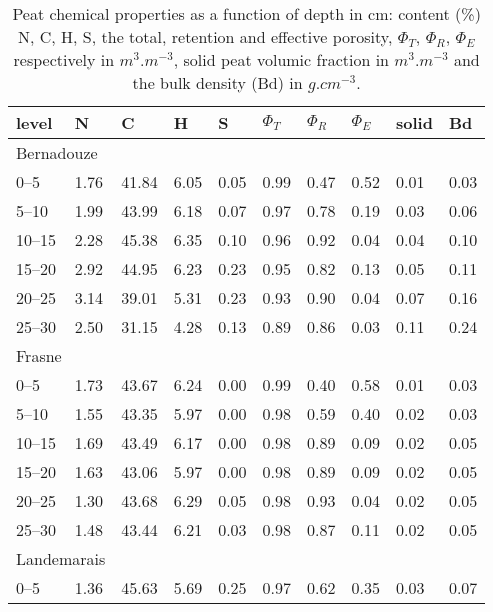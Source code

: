 \begin{table}
\centering
\caption{Peat chemical properties as a function of depth in cm: content (\%) N, C, H, S, the total, retention and effective porosity, $\Phi_{T}$, $\Phi_{R}$, $\Phi_{E}$ respectively in $m^{3}.m^{-3}$, solid peat volumic fraction in $m^{3}.m^{-3}$ and the bulk density (Bd) in $g.cm^{-3}$.} 
\begin{tabular}{llllllllll}
\toprule
level  & N & C & H & S & $\Phi_{T}$ & $\Phi_{R}$ & $\Phi_{E}$ & solid & Bd \\
\midrule
\multicolumn{2}{l}{Bernadouze} & & & & & & & & \\[-.5ex] 
0--5 & 1.76 & 41.84 & 6.05 & 0.05   & 0.99 & 0.47 & 0.52 & 0.01 & 0.03 \\
5--10 & 1.99 & 43.99 & 6.18 & 0.07 & 0.97 & 0.78 & 0.19 & 0.03 & 0.06 \\
10--15 & 2.28 & 45.38 & 6.35 & 0.10 & 0.96 & 0.92 & 0.04 & 0.04 & 0.10 \\ 
15--20 & 2.92 & 44.95 & 6.23 & 0.23 & 0.95 & 0.82 & 0.13 & 0.05 & 0.11 \\ 
20--25 & 3.14 & 39.01 & 5.31 & 0.23 & 0.93 & 0.90 & 0.04 & 0.07 & 0.16 \\
25--30 & 2.50 & 31.15 & 4.28 & 0.13 & 0.89 & 0.86 & 0.03 & 0.11 & 0.24 \\
\multicolumn{2}{l}{Frasne} & & & &  & & & & \\[-.5ex] 
0--5 & 1.73 & 43.67 & 6.24 & 0.00 & 0.99 & 0.40 & 0.58 & 0.01 & 0.03 \\ 
5--10 & 1.55 & 43.35 & 5.97 & 0.00 & 0.98 & 0.59 & 0.40 & 0.02 & 0.03 \\
10--15 & 1.69 & 43.49 & 6.17 & 0.00 & 0.98 & 0.89 & 0.09 & 0.02 & 0.05 \\
15--20 & 1.63 & 43.06 & 5.97 & 0.00 & 0.98 & 0.89 & 0.09 & 0.02 & 0.05 \\
20--25 & 1.30 & 43.68 & 6.29 & 0.05 & 0.98 & 0.93 & 0.04 & 0.02 & 0.05 \\ 
25--30 & 1.48 & 43.44 & 6.21 & 0.03 & 0.98 & 0.87 & 0.11 & 0.02 & 0.05 \\
\multicolumn{2}{l}{Landemarais} & & & & & & & & \\[-.5ex] 
0--5 & 1.36 & 45.63 & 5.69 & 0.25 & 0.97 & 0.62 & 0.35 & 0.03 & 0.07 \\

\end{tabular}
\end{table}
